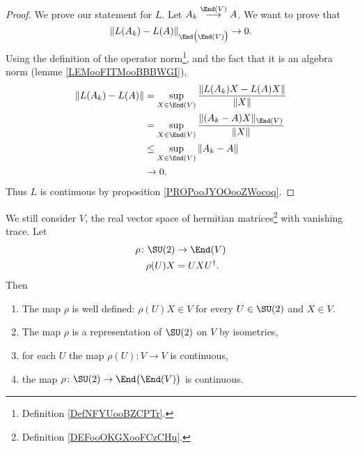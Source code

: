 \begin{proof}
    We prove our statement for \( L\). Let \( A_k\stackrel{\End(V)}{\longrightarrow}A\). We want to prove that
    \begin{equation}
        \| L(A_k)-L(A) \|_{\End\big( \End(V) \big)}\to 0.
    \end{equation}
    Using the definition of the operator norm\footnote{Definition \ref{DefNFYUooBZCPTr}.}, and the fact that it is an algebra norm (lemme \ref{LEMooFITMooBBBWGI}),
    \begin{subequations}
        \begin{align}
            \| L(A_k)-L(A) \|&=\sup_{X\in \End(V)}\frac{ \| L(A_k)X-L(A)X \| }{ \| X \| }\\
            &=\sup_{X\in \End(V)}\frac{ \| (A_k-A)X \|_{\End(V)} }{ \| X \| }\\
            &\leq \sup_{X\in\End(V)}\| A_k-A \|\\
            &\to 0.
        \end{align}
    \end{subequations}
    Thus \( L\) is continuous by proposition \ref{PROPooJYOOooZWocoq}.
\end{proof}

\begin{proposition}     \label{PROPooRQUZooAoZzwx}
    We still consider \( V\), the real vector space of hermitian matrices\footnote{Definition \ref{DEFooOKGXooFCzCHu}.} with vanishing trace. Let
    \begin{equation}
        \begin{aligned}
            \rho\colon \SU(2)&\to \End(V) \\
            \rho(U)X&=UXU^{\dag}.
        \end{aligned}
    \end{equation}
    Then
    \begin{enumerate}
        \item           \label{ITEMooLZBSooZUQGgJ}
            The map \( \rho\) is well defined: \( \rho(U)X\in V\) for every \( U\in \SU(2)\) and \( X\in V\).
        \item
            The map \( \rho\) is a representation of \( \SU(2)\) on \( V\) by isometries,
        \item       \label{ITEMooBZUQooNXNVfs}
            for each \( U\) the map \( \rho(U)\colon V\to V\) is continuous,
        \item       \label{ITEMooGHZYooQuabWb}
            the map \( \rho\colon \SU(2)\to \End\big( \End(V)\big) \) is continuous.
    \end{enumerate}
\end{proposition}

